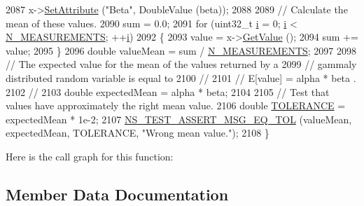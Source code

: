 \begin{DoxyCode}
2087   x->\hyperlink{classns3_1_1ObjectBase_ac60245d3ea4123bbc9b1d391f1f6592f}{SetAttribute} (\textcolor{stringliteral}{"Beta"}, DoubleValue (beta));
2088 
2089   \textcolor{comment}{// Calculate the mean of these values.}
2090   sum = 0.0;
2091   \textcolor{keywordflow}{for} (uint32\_t \hyperlink{bernuolliDistribution_8m_a6f6ccfcf58b31cb6412107d9d5281426}{i} = 0; \hyperlink{bernuolliDistribution_8m_a6f6ccfcf58b31cb6412107d9d5281426}{i} < \hyperlink{classRandomVariableStreamGammaAntitheticTestCase_a0b59ae69267b6ca3649f0617cf02932e}{N\_MEASUREMENTS}; ++\hyperlink{bernuolliDistribution_8m_a6f6ccfcf58b31cb6412107d9d5281426}{i})
2092     \{
2093       value = x->\hyperlink{classns3_1_1GammaRandomVariable_a4bc336892413eab5ba6e1a046cda8bde}{GetValue} ();
2094       sum += value;
2095     \}
2096   \textcolor{keywordtype}{double} valueMean = sum / \hyperlink{classRandomVariableStreamGammaAntitheticTestCase_a0b59ae69267b6ca3649f0617cf02932e}{N\_MEASUREMENTS};
2097 
2098   \textcolor{comment}{// The expected value for the mean of the values returned by a}
2099   \textcolor{comment}{// gammaly distributed random variable is equal to }
2100   \textcolor{comment}{//}
2101   \textcolor{comment}{//     E[value]  =  alpha * beta  .}
2102   \textcolor{comment}{//}
2103   \textcolor{keywordtype}{double} expectedMean = alpha * beta;
2104 
2105   \textcolor{comment}{// Test that values have approximately the right mean value.}
2106   \textcolor{keywordtype}{double} \hyperlink{spectrum-value-test_8cc_a30c17564229ec2e37dfea9c6c9ad643e}{TOLERANCE} = expectedMean * 1e-2;
2107   \hyperlink{group__testing_ga9e7861b56b4e70db3b56044cb7a28e41}{NS\_TEST\_ASSERT\_MSG\_EQ\_TOL} (valueMean, expectedMean, TOLERANCE, \textcolor{stringliteral}{"Wrong mean
       value."}); 
2108 \}
\end{DoxyCode}


Here is the call graph for this function\+:




\subsection{Member Data Documentation}
